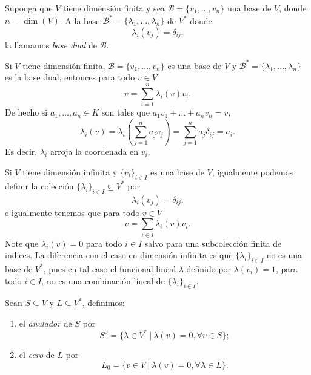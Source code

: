 \begin{defn}
Suponga que $V$ tiene dimensi\'on finita y sea $\mathcal{B}=\{v_1,\ldots,v_n\}$ una base de $V$, donde $n=\dim(V)$. A la base $\mathcal{B}^*=\{\lambda_1,\ldots,\lambda_n\}$ de $V^*$ donde
\[
\lambda_i(v_j)=\delta_{ij}.
\]
la llamamos \emph{base dual} de $\mathcal{B}$.
\end{defn}

\begin{obs}\label{basedualinfinita}
Si $V$ tiene dimensi\'on finita, $\mathcal{B}=\{v_1,\ldots,v_n\}$ es una base de $V$ y $\mathcal{B}^*=\{\lambda_1,\ldots,\lambda_n\}$ es la base dual, entonces para todo $v\in V$
\[
v=\sum_{i=1}^n\lambda_i(v)v_i.
\]
De hecho si $a_1,\ldots,a_n\in K$ son tales que $a_1v_1+\ldots+a_nv_n=v$,
\[
\lambda_i(v)=\lambda_i\left(\sum_{j=1}^na_jv_j\right)=\sum_{j=1}^n a_j\delta_{ij}=a_i.
\]
Es decir, $\lambda_i$ arroja la coordenada en $v_i$.
\end{obs}

\begin{obs}\label{basedualinfinita}
Si $V$ tiene dimensi\'on infinita y $\{v_i\}_{i\in I}$ es una base de $V$, igualmente podemos definir la colecci\'on $\{\lambda_i\}_{i\in I}\subseteq V^*$ por
\[
\lambda_i(v_j)=\delta_{ij}.
\]
e igualmente tenemos que para todo $v\in V$
\[
v=\sum_{i\in I}\lambda_i(v)v_i.
\]
Note que $\lambda_i(v)=0$ para todo $i\in I$ salvo para una subcolecci\'on finita de indices. La diferencia con el caso en dimensi\'on infinita es que $\{\lambda_i\}_{i\in I}$ no es una base de $V^*$, pues en tal caso el funcional lineal $\lambda$ definido por $\lambda(v_i)=1$, para todo $i\in I$, no es una combinaci\'on lineal de $\{\lambda_i\}_{i\in I}$.
\end{obs}

\begin{defn}
Sean $S\subseteq V$ y $L\subseteq V^*$, definimos:
\begin{enumerate}
\item el \emph{anulador} de $S$ por
\[
S^0=\{\lambda\in V^*\ |\ \lambda(v)=0, \forall v\in S\};
\]
\item el \emph{cero} de $L$ por
\[
L_0=\{v\in V\ |\ \lambda(v)=0, \forall \lambda\in L\}.
\]
\end{enumerate} 
\end{defn}

